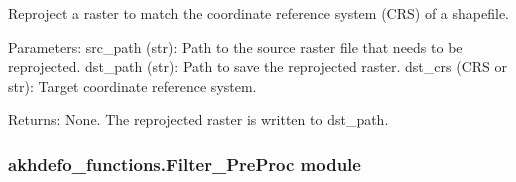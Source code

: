 \documentclass[letterpaper,10pt,english]{sphinxmanual}
\begin{document}

\begin{fulllineitems}
\label{\detokenize{akhdefo_functions:akhdefo_functions.Akhdefo_utils.reproject_raster_to_match_shapefile}}
\pysigstartsignatures
{}
\pysigstopsignatures
\sphinxAtStartPar
Reproject a raster to match the coordinate reference system (CRS) of a shapefile.

\sphinxAtStartPar
Parameters:
\sphinxhyphen{} src\_path (str): Path to the source raster file that needs to be reprojected.
\sphinxhyphen{} dst\_path (str): Path to save the reprojected raster.
\sphinxhyphen{} dst\_crs (CRS or str): Target coordinate reference system.

\sphinxAtStartPar
Returns:
None. The reprojected raster is written to dst\_path.

\end{fulllineitems}



\subsubsection{akhdefo\_functions.Filter\_PreProc module}
\label{\detokenize{akhdefo_functions:module-akhdefo_functions.Filter_PreProc}}\label{\detokenize{akhdefo_functions:akhdefo-functions-filter-preproc-module}}
\end{document}
